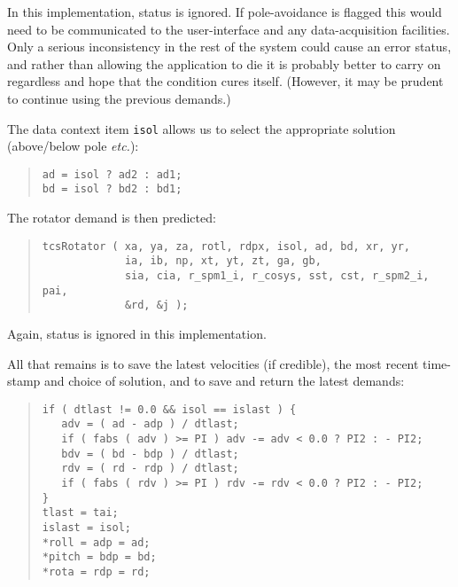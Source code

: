 \documentclass[12pt,fleqn,twoside]{article}
\renewcommand{\_}{{\tt\char'137}}     %
\begin{document}
In this implementation, status is ignored.
If pole-avoidance is flagged this would need to be communicated
to the user-interface and any data-acquisition facilities.
Only a serious
inconsistency in the rest of the system could cause an error
status, and rather than allowing the application to die
it is probably better to carry on regardless and hope that the
condition cures itself.  (However, it may be prudent
to continue using the previous demands.)

The data context item {\tt isol} allows us
to select the appropriate solution (above/below pole {\it etc.}):
\begin{quote}
\begin{small}
\begin{verbatim}
ad = isol ? ad2 : ad1;
bd = isol ? bd2 : bd1;
\end{verbatim}\end{small}
\end{quote}
The rotator demand is then predicted:
\begin{quote}
\begin{small}
\begin{verbatim}
tcsRotator ( xa, ya, za, rotl, rdpx, isol, ad, bd, xr, yr,
             ia, ib, np, xt, yt, zt, ga, gb,
             sia, cia, r_spm1_i, r_cosys, sst, cst, r_spm2_i, pai,
             &rd, &j );
\end{verbatim}\end{small}
\end{quote}
Again, status is ignored in this implementation.

All that remains is to save the latest velocities (if credible),
the most recent time-stamp and choice of solution, and to save and
return the latest demands:
\begin{quote}
\begin{small}
\begin{verbatim}
if ( dtlast != 0.0 && isol == islast ) {
   adv = ( ad - adp ) / dtlast;
   if ( fabs ( adv ) >= PI ) adv -= adv < 0.0 ? PI2 : - PI2;
   bdv = ( bd - bdp ) / dtlast;
   rdv = ( rd - rdp ) / dtlast;
   if ( fabs ( rdv ) >= PI ) rdv -= rdv < 0.0 ? PI2 : - PI2;
}
tlast = tai;
islast = isol;
*roll = adp = ad;
*pitch = bdp = bd;
*rota = rdp = rd;
\end{verbatim}\end{small}
\end{quote}

\end{document}
